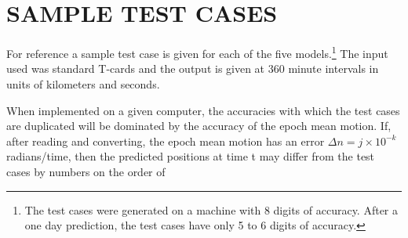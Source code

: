 \section[Sample Test Cases]{SAMPLE TEST CASES}
For reference a sample test case is given for each of the five
models.\footnote[1]{The test cases were generated on a machine with 8
digits of accuracy.  After a one day prediction, the test cases have only 5 to
6 digits of accuracy.}  The input used was standard T-cards and the output is
given at 360 minute intervals in units of kilometers and seconds.

When implemented on a given computer, the accuracies with which the test cases
are duplicated will be dominated by the accuracy of the epoch mean motion.
If, after reading and converting, the epoch mean motion has an error $\Delta n
= j \times 10^{-k}$ radians/time, then the predicted positions at time t may
differ from the test cases by numbers on the order of

